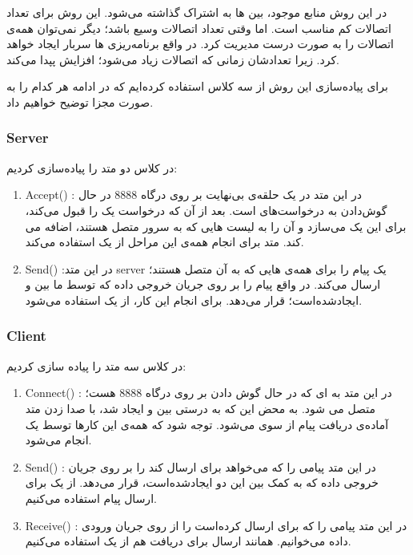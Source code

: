در این روش منابع موجود، بین 
ها به اشتراک گذاشته می‌شود. این روش برای تعداد اتصالات کم مناسب است. اما وقتی تعداد اتصالات وسیع باشد؛ دیگر نمی‌توان همه‌ی اتصالات را به صورت درست مدیریت کرد. در واقع برنامه‌ریزی
ها سربار ایجاد خواهد کرد. زیرا تعداد‌شان زمانی که اتصالات زیاد می‌شود؛ افزایش پپدا می‌کند.

برای پیاده‌سازی این روش از سه کلاس استفاده کرده‌ایم که در ادامه هر کدام را به صورت مجزا توضیح خواهیم داد.
\subsubsection{Server}
در کلاس 
دو متد را پیاده‌سازی کردیم:
\begin{enumerate}
	\item Accept()
: در این متد 
در یک حلقه‌ی بی‌نهایت بر روی درگاه 8888 در حال گوش‌دادن به درخواست‌های 
است. بعد از آن که
درخواست یک 
را قبول می‌کند، برای این 
یک 
می‌سازد و آن را به لیست 
هایی که به سرور متصل هستند، اضافه می کند. متد 
برای انجام همه‌ی این مراحل از یک 
استفاده می‌کند.
	\item Send()
	:در این متد server یک پیام را برای همه‌ی 
	هایی که به آن متصل هستند؛ ارسال می‌کند. در واقع پیام را بر روی جریان خروجی داده که توسط 
	ما بین 
	و 
	ایجاد‌شده‌است؛ قرار می‌دهد. برای انجام این کار، از یک 
	استفاده می‌شود.
\end{enumerate}

\subsubsection{Client}
در کلاس 
سه متد را پیاده سازی کردیم:
\begin{enumerate}
	\item Connect()
	: در این متد 
	 به 
‌ای که در حال گوش دادن بر روی درگاه 8888 هست؛ متصل می شود. به محض این که 
	به درستی بین 
	و
	ایجاد شد، 
	با صدا زدن متد
	آماده‌ی دریافت پیام از سوی 
	می‌شود. توجه شود که همه‌ی این کار‌ها توسط یک 
	انجام می‌شود.
	\item Send()
	: در این متد 
	پیامی را که می‌خواهد برای 
	ارسال کند را بر روی جریان خروجی داده که به کمک 
	بین این دو ایجاد‌شده‌است، قرار می‌دهد. از یک 
	برای ارسال پیام استفاده می‌کنیم.
	\item Receive()
	: در این متد پیامی را که 
	برای
	ارسال کرده‌است را از روی جریان ورودی داده می‌خوانیم. همانند ارسال برای دریافت هم از یک 
	استفاده می‌کنیم.
\end{enumerate}

